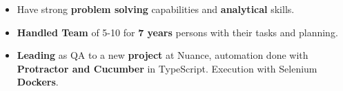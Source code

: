 \begin{cvparagraph}
\begin{itemize}
 \item {Have strong \textbf{problem solving} capabilities and \textbf{analytical} skills.}

 \item {\textbf{Handled Team} of 5-10 for \textbf{7 years} persons with their tasks and planning.}
 
 \item {\textbf{Leading} as QA to a new \textbf{project} at Nuance, automation done with \textbf{Protractor and Cucumber} in TypeScript. Execution with Selenium \textbf{Dockers}.}
\end{itemize}
\end{cvparagraph}

